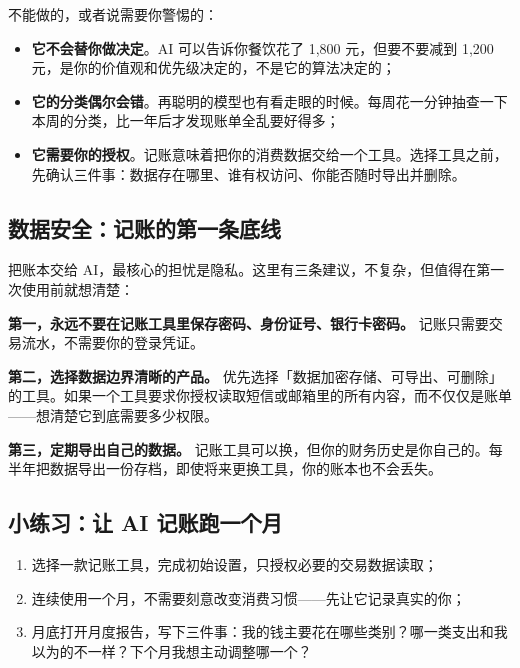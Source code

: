 \documentclass[a4paper,11pt,oneside,fontset=none,UTF8,zihao=-4]{ctexbook}
\providecommand{\tightlist}{\setlength{\itemsep}{2pt}\setlength{\parskip}{1pt}}
\begin{document}
不能做的，或者说需要你警惕的：

\begin{itemize}
\tightlist
\item
  \textbf{它不会替你做决定}。AI 可以告诉你餐饮花了 1,800
  元，但要不要减到 1,200
  元，是你的价值观和优先级决定的，不是它的算法决定的；
\item
  \textbf{它的分类偶尔会错}。再聪明的模型也有看走眼的时候。每周花一分钟抽查一下本周的分类，比一年后才发现账单全乱要好得多；
\item
  \textbf{它需要你的授权}。记账意味着把你的消费数据交给一个工具。选择工具之前，先确认三件事：数据存在哪里、谁有权访问、你能否随时导出并删除。
\end{itemize}

\subsection{数据安全：记账的第一条底线}\label{ux6570ux636eux5b89ux5168ux8bb0ux8d26ux7684ux7b2cux4e00ux6761ux5e95ux7ebf}

把账本交给
AI，最核心的担忧是隐私。这里有三条建议，不复杂，但值得在第一次使用前就想清楚：

\textbf{第一，永远不要在记账工具里保存密码、身份证号、银行卡密码。}
记账只需要交易流水，不需要你的登录凭证。

\textbf{第二，选择数据边界清晰的产品。}
优先选择「数据加密存储、可导出、可删除」的工具。如果一个工具要求你授权读取短信或邮箱里的所有内容，而不仅仅是账单------想清楚它到底需要多少权限。

\textbf{第三，定期导出自己的数据。}
记账工具可以换，但你的财务历史是你自己的。每半年把数据导出一份存档，即使将来更换工具，你的账本也不会丢失。

\subsection{小练习：让 AI
记账跑一个月}\label{ux5c0fux7ec3ux4e60ux8ba9-ai-ux8bb0ux8d26ux8dd1ux4e00ux4e2aux6708}

\begin{enumerate}
\def\labelenumi{\arabic{enumi}.}
\tightlist
\item
  选择一款记账工具，完成初始设置，只授权必要的交易数据读取；
\item
  连续使用一个月，不需要刻意改变消费习惯------先让它记录真实的你；
\item
  月底打开月度报告，写下三件事：我的钱主要花在哪些类别？哪一类支出和我以为的不一样？下个月我想主动调整哪一个？
\end{enumerate}
\end{document}
